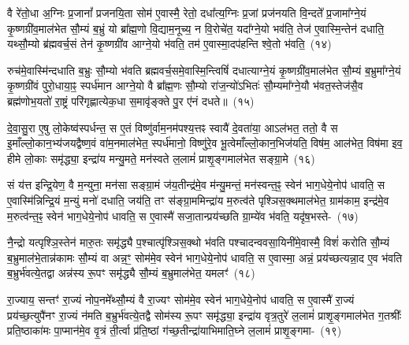 वै रे॑तो॒धा अ॒ग्निः प्र॒जानां᳚ प्रजनयि॒ता सोम॑ ए॒वास्मै॒ रेतो॒ दधा᳚त्य॒ग्निः प्र॒जां प्रज॑नयति वि॒न्दते᳚ प्र॒जामा᳚ग्ने॒यं कृ॒ष्ण\-ग्री॑व॒माल॑भेत सौ॒म्यं ब॒भ्रुं यो ब्रा᳚ह्म॒णो वि॒द्याम॒नूच्य॒ न वि॒रोचे॑त॒ यदा᳚ग्ने॒यो भव॑ति॒ तेज॑ ए॒वास्मि॒न्तेन॑ दधाति॒ यथ्सौ॒म्यो ब्र॑ह्मवर्च॒सं तेन॑ कृ॒ष्णग्री॑व आग्ने॒यो भ॑वति॒ तम॑ ए॒वास्मा॒दप॑हन्ति श्वे॒तो भ॑वति॒~(१४)

रुच॑मे॒वास्मि॑न्दधाति ब॒भ्रुः सौ॒म्यो भ॑वति ब्रह्मवर्च॒स\-मे॒वास्मि॒न्त्विषिं॑ दधात्याग्ने॒यं कृ॒ष्णग्री॑व॒माल॑भेत सौ॒म्यं ब॒भ्रुमा᳚ग्ने॒यं कृ॒ष्णग्री॑वं पुरो॒धाया॒ꣴ॒ स्पर्ध॑मान आग्ने॒यो वै ब्रा᳚ह्म॒णः सौ॒म्यो रा॑ज॒न्यो॑\-ऽभितः॑ सौ॒म्यमा᳚ग्ने॒यौ भ॑वत॒स्तेज॑सै॒व ब्रह्म॑णोभ॒यतो॑ रा॒ष्ट्रं परि॑\-गृह्णात्येक॒धा स॒मावृ॑ङ्क्ते पु॒र ए॑नं दधते॥~(१५)

{}

दे॒वा॒सु॒रा ए॒षु लो॒केष्व॑स्पर्धन्त॒ स ए॒तं विष्णु॑र्वाम॒नम॑\-पश्य॒त्तꣴ स्वायै॑ दे॒वता॑या॒ आ\-ऽल॑भत॒ ततो॒ वै स इ॒माँल्लो॒कान॒भ्य॑\-जयद्वैष्ण॒वं वा॑म॒नमा\-ल॑भेत॒ स्पर्ध॑मानो॒ विष्णु॑रे॒व भू॒त्वेमाँल्लो॒कान॒भिज॑यति॒ विष॑म॒ आ\-ल॑भेत॒ विष॑मा इव॒ हीमे लो॒काः समृ॑द्ध्या॒ इन्द्रा॑य मन्यु॒मते॒ मन॑स्वते ल॒लामं॑ प्राशृ॒ङ्गमाल॑भेत सङ्ग्रा॒मे~(१६)

सं य॑त्त इन्द्रि॒येण॒ वै म॒न्युना॒ मन॑सा सङ्ग्रा॒मं ज॑य॒तीन्द्र॑मे॒व म॑न्यु॒मन्तं॒ मन॑स्वन्त॒ꣴ॒ स्वेन॑ भाग॒धेये॒नोप॑ धावति॒ स ए॒वास्मि॑न्निन्द्रि॒यं म॒न्युं मनो॑ दधाति॒ जय॑ति॒ तꣳ स॑ङ्ग्रा॒ममिन्द्रा॑य म॒रुत्व॑ते पृश्ञिस॒क्थमा\-ल॑भेत॒ ग्राम॑काम॒ इन्द्र॑मे॒व म॒रुत्व॑न्त॒ꣴ॒ स्वेन॑ भाग॒धेये॒नोप॑ धावति॒ स ए॒वास्मै॑ सजा॒तान्प्रय॑च्छति ग्रा॒म्ये॑व भ॑वति॒ यदृ॑ष॒भस्ते-~(१७)

नै॒न्द्रो यत्पृश्ञि॒स्तेन॑ मारु॒तः समृ॑द्ध्यै प॒श्चात्पृ॑श्ञिस॒क्थो भ॑वति पश्चादन्ववसा॒यिनी॑मे॒वास्मै॒ विशं॑ करोति सौ॒म्यं ब॒भ्रुमाल॑भे॒तान्न॑कामः सौ॒म्यं वा अन्न॒ꣳ॒ सोम॑मे॒व स्वेन॑ भाग॒धेये॒नोप॑ धावति॒ स ए॒वास्मा॒ अन्नं॒ प्रय॑च्छत्यन्ना॒द ए॒व भ॑वति ब॒भ्रुर्भ॑वत्ये॒तद्वा अन्न॑स्य रू॒पꣳ समृ॑द्ध्यै सौ॒म्यं ब॒भ्रुमा\-ल॑भेत॒ यमलꣳ॑~(१८)

रा॒ज्याय॒ सन्तꣳ॑ रा॒ज्यं नोप॒नमे᳚थ्सौ॒म्यं वै रा॒ज्यꣳ सोम॑मे॒व स्वेन॑ भाग॒धेये॒नोप॑ धावति॒ स ए॒वास्मै॑ रा॒ज्यं प्रय॑च्छ॒त्युपै॑नꣳ रा॒ज्यं न॑मति ब॒भ्रुर्भ॑वत्ये॒तद्वै सोम॑स्य रू॒पꣳ समृ॑द्ध्या॒ इन्द्रा॑य वृत्र॒तुरे॑ ल॒लामं॑ प्राशृ॒ङ्गमाल॑भेत ग॒तश्रीः᳚ प्रति॒ष्ठाका॑मः पा॒प्मान॑मे॒व वृ॒त्रं ती॒र्त्वा प्र॑ति॒ष्ठां ग॑च्छ॒तीन्द्रा॑याभिमाति॒घ्ने ल॒लामं॑ प्राशृ॒ङ्गमा-~(१९)

